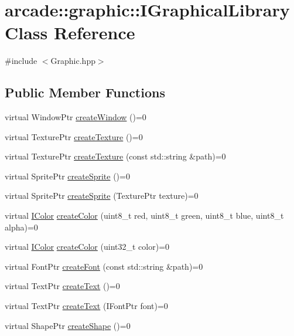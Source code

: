 \hypertarget{classarcade_1_1graphic_1_1_i_graphical_library}{}\section{arcade\+::graphic\+::I\+Graphical\+Library Class Reference}
\label{classarcade_1_1graphic_1_1_i_graphical_library}


{\ttfamily \#include $<$Graphic.\+hpp$>$}

\subsection*{Public Member Functions}
\begin{DoxyCompactItemize}
\item 
virtual Window\+Ptr \mbox{\hyperlink{classarcade_1_1graphic_1_1_i_graphical_library_a98d401c1c0d6829857393e76a472f166}{create\+Window}} ()=0
\item 
virtual Texture\+Ptr \mbox{\hyperlink{classarcade_1_1graphic_1_1_i_graphical_library_a034577aa2702771ba0834e1ad98ed5a0}{create\+Texture}} ()=0
\item 
virtual Texture\+Ptr \mbox{\hyperlink{classarcade_1_1graphic_1_1_i_graphical_library_a8c14d0d54d1216279ad5c80702f53086}{create\+Texture}} (const std\+::string \&path)=0
\item 
virtual Sprite\+Ptr \mbox{\hyperlink{classarcade_1_1graphic_1_1_i_graphical_library_a5701fd02a99c9943972abe2bef53de39}{create\+Sprite}} ()=0
\item 
virtual Sprite\+Ptr \mbox{\hyperlink{classarcade_1_1graphic_1_1_i_graphical_library_a22d325c6237cae0543d58e321de675f6}{create\+Sprite}} (Texture\+Ptr texture)=0
\item 
virtual \mbox{\hyperlink{classarcade_1_1graphic_1_1_i_color}{I\+Color}} \mbox{\hyperlink{classarcade_1_1graphic_1_1_i_graphical_library_a5ae198a5af194e9546eb7ae09fc4bf20}{create\+Color}} (uint8\+\_\+t red, uint8\+\_\+t green, uint8\+\_\+t blue, uint8\+\_\+t alpha)=0
\item 
virtual \mbox{\hyperlink{classarcade_1_1graphic_1_1_i_color}{I\+Color}} \mbox{\hyperlink{classarcade_1_1graphic_1_1_i_graphical_library_aac999a46fab3948f3c896a263f89f0fb}{create\+Color}} (uint32\+\_\+t color)=0
\item 
virtual Font\+Ptr \mbox{\hyperlink{classarcade_1_1graphic_1_1_i_graphical_library_a30565d5cc8678c38aa7dc447b9144242}{create\+Font}} (const std\+::string \&path)=0
\item 
virtual Text\+Ptr \mbox{\hyperlink{classarcade_1_1graphic_1_1_i_graphical_library_a574563b85a4ed24d884381a31e95e888}{create\+Text}} ()=0
\item 
virtual Text\+Ptr \mbox{\hyperlink{classarcade_1_1graphic_1_1_i_graphical_library_ac43fde5e21945aaccba8414dbadcb1ce}{create\+Text}} (I\+Font\+Ptr font)=0
\item 
virtual Shape\+Ptr \mbox{\hyperlink{classarcade_1_1graphic_1_1_i_graphical_library_acb195feccab5c859a468a852e5882b09}{create\+Shape}} ()=0
\end{DoxyCompactItemize}



